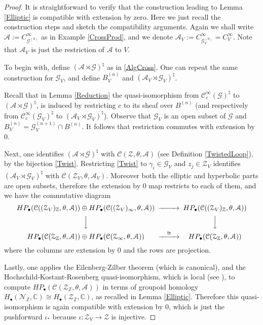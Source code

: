 \documentclass[a4paper]{amsart}
\newcommand{\CC}{\mathbb C}
\newcommand{\ZZ}{\mathbb Z}
\newcommand{\maA}{\mathcal A}
\newcommand{\maC}{\mathcal C}
\newcommand{\maG}{\mathcal G}
\newcommand{\maN}{\mathcal N}
\newcommand{\maZ}{\mathcal Z}
\newcommand\<{\langle}
\renewcommand\>{\rangle}
\theoremstyle{definition}
\theoremstyle{remark}
\begin{document}
\begin{proof}
It is straightforward to verify that the construction leading to Lemma \ref{Elliptic} is compatible with extension by zero.
Here we just recall the construction steps and sketch the compatibility arguments.
Again we shall write $\maA := C^\infty _{\maG ^{(0)}}$ as in Example \ref{CrossProd},
and we denote $\maA _V := C^\infty _{\maG ^{(0)} _V} = C^\infty _V$.
Note that $\maA _V$ is just the restriction of $\maA$ to $V$.

To begin with, define $(\maA \rtimes \maG) ^\natural $ as in \eqref{AlgCross}.
One can repeat the same construction for $\maG _V$, and define $B ^{(n)}_V$ and $(\maA _V \rtimes \maG _V) ^\natural$.

Recall that in Lemma \ref{Reduction} the quasi-isomorphism from
$\maC^{\infty}_c (\maG ) ^\natural$ to $(\maA \rtimes \maG) ^\natural$,
is induced by restricting $c$ to its sheaf over $B ^{(n)}$
(and respectively from $\maC^{\infty}_c (\maG _V )^\natural$ to $(\maA _V \rtimes \maG _V) ^\natural$).
Observe that $\maG _V $ is an open subset of $\maG$ and $B ^{(n)}_V = \maG ^{(n+1)} _V \cap B ^{(n)}$.
It follows that restriction commutes with extension by $0$.

Next, one identifies $(\maA \rtimes \maG) ^\natural$ with $\maC (\maZ , \theta , \maA)$ (see Definition \ref{TwistedLoop}),
by the bijection \eqref{Twist}.
Restricting \eqref{Twist} to $\gamma _i \in \maG _V$ and $z_j \in \maZ _V$ identifies
$(\maA _V \rtimes \maG _V) ^\natural$ with $\maC (\maZ _V , \theta , \maA _V)$.
Moreover both the elliptic and hyperbolic parts are open subsets,
therefore the extension by $0$ map restricts to each of them,
and we have the commutative diagram
$$
\begin{CD}
H P _\bullet (\maC ((\maZ _{V})_\ZZ , \theta , \maA))
\oplus  H P _\bullet (\maC ((\maZ _{V})_\infty , \theta , \maA))
@>>> H P _\bullet (\maC ((\maZ _{V})_\ZZ , \theta , \maA)) \\
@VVV @VVV \\
H P _\bullet (\maC (\maZ_\ZZ , \theta , \maA))
\oplus  H P _\bullet (\maC (\maZ _\infty , \theta , \maA))
@>{\cong}>> H P _\bullet (\maC (\maZ _\ZZ , \theta , \maA))
\end{CD}
$$
where the columns are extension by $0$ and the rows are projection.

Lastly, one applies the Eilenberg-Zilber theorem (which is canonical),
and the Hochschild-Kostant-Rosenberg quasi-isomorphism, which is local (see \cite[Lemma 3.5]{Crainic;EtaleGpoid}),
to compute $H P _\bullet (\maC (\maZ _\ZZ , \theta , \maA))$
in terms of groupoid homology
$H _\bullet (\maN _\ZZ , \CC) \cong H _\bullet (\maZ _\ZZ , \CC)$, as recalled in Lemma \ref{Elliptic}.
Therefore this quasi-isomorphism is again compatible with extension by $0$,
which is just the pushforward $\iota _*$ because $\iota : \maZ _V \to \maZ$ is injective.
\end{proof}
\end{document}
